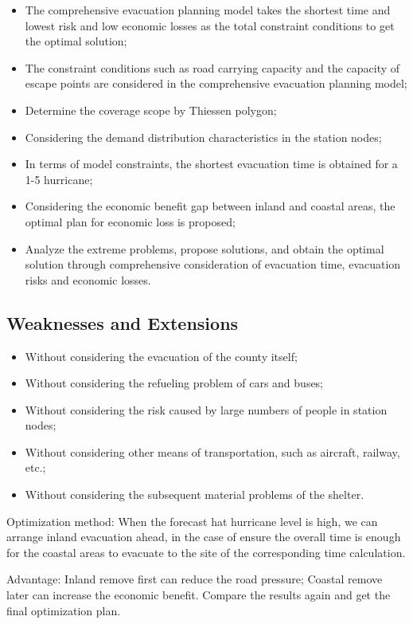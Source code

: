 \documentclass{mcmthesis}
\begin{document}
\begin{itemize}
  \item The comprehensive evacuation planning model takes the shortest time and lowest risk and low economic losses as the total constraint conditions to get the optimal solution;
  \item The constraint conditions such as road carrying capacity and the capacity of escape points are considered in the comprehensive evacuation planning model;
  \item Determine the coverage scope by Thiessen polygon;
  \item Considering the demand distribution characteristics in the station nodes;
  \item In terms of model constraints, the shortest evacuation time is obtained for a 1-5 hurricane;
  \item Considering the economic benefit gap between inland and coastal areas, the optimal plan for economic loss is proposed;
  \item Analyze the extreme problems, propose solutions, and obtain the optimal solution through comprehensive consideration of evacuation time, evacuation risks and economic losses.
\end{itemize}

\subsection{Weaknesses and Extensions}
\begin{itemize}
  \item Without considering the evacuation of the county itself;
  \item Without considering the refueling problem of cars and buses;
  \item Without considering the risk caused by large numbers of people in station nodes;
  \item Without considering other means of transportation, such as aircraft, railway, etc.;
  \item Without considering the subsequent material problems of the shelter.
\end{itemize}

Optimization method: When the forecast hat hurricane level is high, we can arrange inland evacuation ahead, in the case of ensure the overall time is enough for the coastal areas to evacuate to the site of the corresponding time calculation.

Advantage: Inland remove first can reduce the road pressure; Coastal remove later can increase the economic benefit. Compare the results again and get the final optimization plan.
\end{document}
